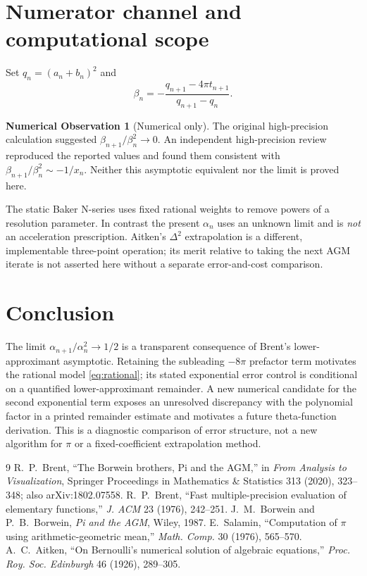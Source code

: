 \documentclass[11pt]{article}
\theoremstyle{definition}\newtheorem{remark}{Remark}\newtheorem{observation}{Numerical Observation}
\begin{document}
\section{Numerator channel and computational scope}
Set $q_n=(a_n+b_n)^2$ and
\[\beta_n=-\frac{q_{n+1}-4\pi t_{n+1}}{q_{n+1}-q_n}.\]
\begin{observation}[Numerical only]
The original high-precision calculation suggested $\beta_{n+1}/\beta_n^2\to0$. An independent high-precision review reproduced the reported values and found them consistent with $\beta_{n+1}/\beta_n^2\sim-1/x_n$. Neither this asymptotic equivalent nor the limit is proved here.
\end{observation}
The static Baker N-series uses fixed rational weights to remove powers of a resolution parameter. In contrast the present $\alpha_n$ uses an unknown limit and is \emph{not} an acceleration prescription. Aitken's $\Delta^2$ extrapolation is a different, implementable three-point operation; its merit relative to taking the next AGM iterate is not asserted here without a separate error-and-cost comparison.
\section{Conclusion}
The limit $\alpha_{n+1}/\alpha_n^2\to1/2$ is a transparent consequence of Brent's lower-approximant asymptotic. Retaining the subleading $-8\pi$ prefactor term motivates the rational model \eqref{eq:rational}; its stated exponential error control is conditional on a quantified lower-approximant remainder. A new numerical candidate for the second exponential term exposes an unresolved discrepancy with the polynomial factor in a printed remainder estimate and motivates a future theta-function derivation. This is a diagnostic comparison of error structure, not a new algorithm for $\pi$ or a fixed-coefficient extrapolation method.
\begin{thebibliography}{9}
 R.~P.~Brent, ``The Borwein brothers, Pi and the AGM,'' in \emph{From Analysis to Visualization}, Springer Proceedings in Mathematics \& Statistics 313 (2020), 323--348; also arXiv:1802.07558.
 R.~P.~Brent, ``Fast multiple-precision evaluation of elementary functions,'' \emph{J. ACM} 23 (1976), 242--251.
 J.~M.~Borwein and P.~B.~Borwein, \emph{Pi and the AGM}, Wiley, 1987.
 E.~Salamin, ``Computation of $\pi$ using arithmetic-geometric mean,'' \emph{Math. Comp.} 30 (1976), 565--570.
 A.~C.~Aitken, ``On Bernoulli's numerical solution of algebraic equations,'' \emph{Proc. Roy. Soc. Edinburgh} 46 (1926), 289--305.
\end{thebibliography}
\end{document}
